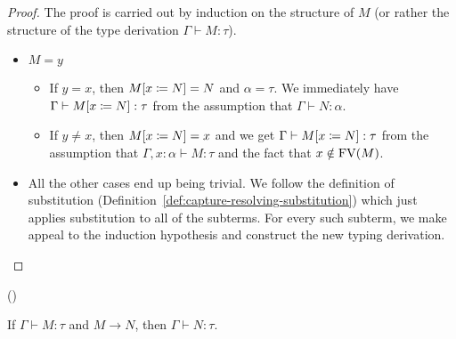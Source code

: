 \begin{proof}
  The proof is carried out by induction on the structure of $M$ (or rather
  the structure of the type derivation $\Gamma \vdash M : \tau$).

  \begin{itemize}
  \item $M = y$
    \begin{itemize}
    \item If $y = x$, then $M[x \coloneqq N] = N$ and $\alpha = \tau$. We
      immediately have $\Gamma \vdash M[x \coloneqq N] : \tau$ from the
      assumption that $\Gamma \vdash N : \alpha$.
    \item If $y \neq x$, then $M[x \coloneqq N] = x$ and we get
      $\Gamma \vdash M[x \coloneqq N] : \tau$ from the assumption that
      $\Gamma, x : \alpha \vdash M : \tau$ and the fact that
      $x \notin \operatorname{FV}(M)$.
    \end{itemize}
  
  \item All the other cases end up being trivial. We follow the definition
    of substitution (Definition~\ref{def:capture-resolving-substitution})
    which just applies substitution to all of the subterms. For every such
    subterm, we make appeal to the induction hypothesis and construct the
    new typing derivation.
  \end{itemize}
\end{proof}

\begin{property}\label{prop:subject-reduction}
  ()
  
  If $\Gamma \vdash M : \tau$ and $M \to N$, then $\Gamma \vdash N : \tau$.
\end{property}

